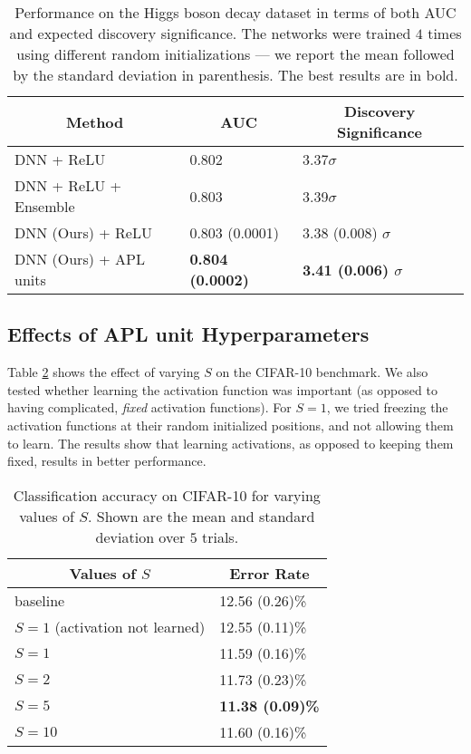 \documentclass{article} \usepackage{iclr2015,times}
\begin{document}
\begin{table}[h]
\caption{Performance on the Higgs boson decay dataset in terms of both AUC and expected discovery significance. The networks were trained $4$ times using different random initializations --- we report the mean followed by the standard deviation in parenthesis. The best results are in bold.}
\label{tab:higgsboson}
\begin{center}
\begin{tabular}{lll}
\multicolumn{1}{c}{\bf Method}  &\multicolumn{1}{c}{\bf AUC} &\multicolumn{1}{c}{\bf Discovery Significance}\\
\hline
DNN + ReLU \citep{baldi2014enhanced} & 0.802 & 3.37$\sigma$ \\
DNN + ReLU + Ensemble\citep{baldi2014enhanced} & 0.803 & 3.39$\sigma$ \\
DNN (Ours) + ReLU & 0.803 (0.0001) & 3.38 (0.008) $\sigma$  \\
DNN (Ours) + APL units & \bf0.804 (0.0002) & \bf3.41 (0.006) $\sigma$   \\
\hline
\end{tabular}
\end{center}
\end{table}

\subsection{Effects of APL unit Hyperparameters}
\label{sec:hyperparams}
Table \ref{inputcoeff} shows the effect of varying $S$ on the CIFAR-10 benchmark. We also tested whether learning the activation function was important (as opposed to having complicated, \emph{fixed} activation functions). For $S=1$, we tried freezing the activation functions at their random initialized positions, and not allowing them to learn. The results show that learning activations, as opposed to keeping them fixed, results in better performance.

\begin{table}[h]
\caption{Classification accuracy on CIFAR-10 for varying values of $S$. Shown are the mean and standard deviation over $5$ trials.}
\label{inputcoeff}
\begin{center}
\begin{tabular}{ll}
\multicolumn{1}{c}{\bf Values of $S$}  &\multicolumn{1}{c}{\bf Error Rate}
\\ \hline
 baseline & 12.56 (0.26)\%\\
 \hline
 $S=1$ (activation not learned) & 12.55 (0.11)\%\\
 $S=1$ & 11.59 (0.16)\%\\
 \hline
 $S=2$ & 11.73 (0.23)\%\\
 \hline
 $S=5$ & \bf11.38 (0.09)\%\\
\hline
 $S=10$ & 11.60 (0.16)\%\\
 \hline
\end{tabular}
\end{center}
\end{table}
\end{document}
